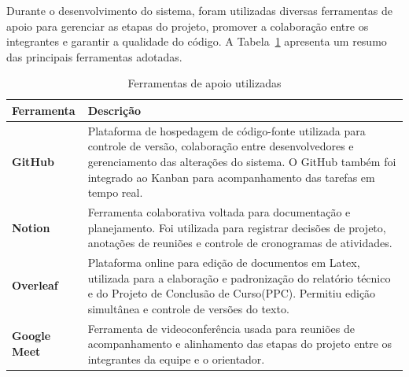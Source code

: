 Durante o desenvolvimento do sistema, foram utilizadas diversas ferramentas de apoio para gerenciar as etapas do projeto, promover a colaboração entre os integrantes e garantir a qualidade do código. A Tabela~\ref{tab:ferramentas-apoio} apresenta um resumo das principais ferramentas adotadas.

\begin{table}[H]
\centering
\caption{Ferramentas de apoio utilizadas}
\label{tab:ferramentas-apoio}
\begin{tabular}{|p{3cm}|p{11cm}|}
\hline
\textbf{Ferramenta} & \textbf{Descrição} \\ \hline

\textbf{GitHub} & Plataforma de hospedagem de código-fonte utilizada para controle de versão, colaboração entre desenvolvedores e gerenciamento das alterações do sistema. O GitHub também foi integrado ao Kanban para acompanhamento das tarefas em tempo real. \\ \hline

\textbf{Notion} & Ferramenta colaborativa voltada para documentação e planejamento. Foi utilizada para registrar decisões de projeto, anotações de reuniões e controle de cronogramas de atividades. \\ \hline

\textbf{Overleaf} & Plataforma online para edição de documentos em Latex, utilizada para a elaboração e padronização do relatório técnico e do Projeto de Conclusão de Curso(PPC). Permitiu edição simultânea e controle de versões do texto. \\ \hline

\textbf{Google Meet} & Ferramenta de videoconferência usada para reuniões de acompanhamento e alinhamento das etapas do projeto entre os integrantes da equipe e o orientador. \\ \hline


\end{tabular}
\end{table}